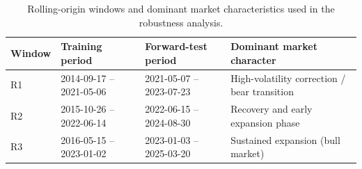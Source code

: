\begin{table}[H]
\centering
\caption{Rolling-origin windows and dominant market characteristics used in the robustness analysis.}
\label{tab:rolling_origin_appendix}
\begin{tabular}{l l l l}
\toprule
\textbf{Window} & \textbf{Training period} & \textbf{Forward-test period} & \textbf{Dominant market character} \\
\midrule
R1 & 2014-09-17 -- 2021-05-06 & 2021-05-07 -- 2023-07-23 & High-volatility correction / bear transition \\
R2 & 2015-10-26 -- 2022-06-14 & 2022-06-15 -- 2024-08-30 & Recovery and early expansion phase \\
R3 & 2016-05-15 -- 2023-01-02 & 2023-01-03 -- 2025-03-20 & Sustained expansion (bull market) \\
\bottomrule
\end{tabular}
\end{table}
